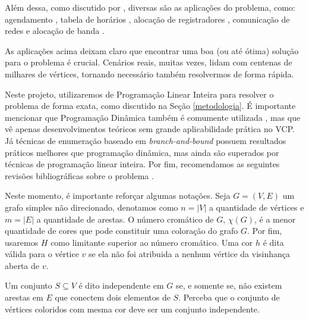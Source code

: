 \documentclass[10pt]{article}
\begin{document}
Além dessa, como discutido por \textcite{Malaguti2010SurveyVertexColoring}, diversas são as aplicações do problema, como: agendamento \autocite{Leighton1979GraphColoringAlgorithm}, tabela de horários \autocite{Werra1985introductiontimetabling}, alocação de registradores \autocite{Chow1990prioritybasedcoloring}, comunicação de redes \autocite{Caprara2007PassengerRailwayOptimization} e alocação de banda \autocite{Gamst1986Somelowerbounds}.

As aplicações acima deixam claro que encontrar uma boa (ou até ótima) solução para o problema é crucial.
Cenários reais, muitas vezes, lidam com centenas de milhares de vértices, tornando necessário também resolvermos de forma rápida.

Neste projeto, utilizaremos de Programação Linear Inteira para resolver o problema de forma exata, como discutido na Seção \ref{metodologia}.
É importante mencionar que Programação Dinâmica também é comumente utilizada \autocites{Eppstein2006SmallMaximalIndependent}[][]{Byskov2002ChromaticNumberTime}, mas que vê apenas desenvolvimentos teóricos sem grande aplicabilidade prática no VCP.
Já técnicas de enumeração baseado em \emph{branch-and-bound} \autocite{Brelaz1979Newmethodscolor} possuem resultados práticos melhores que programação dinâmica, mas ainda são superados por técnicas de programação linear inteira.
Por fim, recomendamos as seguintes revisões bibliográficas sobre o problema \autocites{Malaguti2010SurveyVertexColoring}[][]{Lewis2015GuideGraphColouring}[][]{Husfeldt2015Graphcolouringalgorithms}[][]{Lima2018ExactAlgorithmsGraph}.

Neste momento, é importante reforçar algumas notações.
Seja \(G = (V,E)\) um grafo simples não direcionado, denotamos como \(n = |V|\) a quantidade de vértices e \(m = |E|\) a quantidade de arestas.
O número cromático de \(G\),  \(\chi(G)\), é a menor quantidade de cores que pode constituir uma coloração do grafo \(G\).
Por fim, usaremos \(H\) como limitante superior ao número cromático.
Uma cor \(h\) é dita válida para o vértice \(v\) se ela não foi atribuida a nenhum vértice da visinhança aberta de \(v\).

Um conjunto \(S \subseteq V\) é dito independente em \(G\) se, e somente se, não existem arestas em \(E\) que conectem dois elementos de \(S\).
Perceba que o conjunto de vértices coloridos com mesma cor deve ser um conjunto independente.
\end{document}
